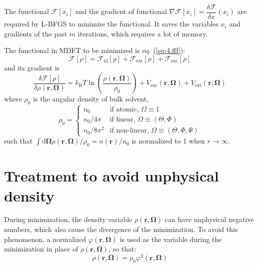 The functional $\mathcal{F}[x_{i}]$ and the gradient of functional
$\nabla\mathcal{F}[x_{i}]=\dfrac{\delta\mathcal{F}}{\delta x}(x_{i})$
are required by L-BFGS to minimize the functional. It saves the variables
$x_{i}$ and gradients of the past $m$ iterations, which requires
a lot of memory.

The functional in MDFT to be minimized is eq. (\ref{eq:4.fff}):
\begin{equation}
\mathcal{F}[\rho]=\mathcal{F}_{\mathrm{id}}[\rho]+\mathcal{F}_{\mathrm{ext}}[\rho]+\mathcal{F}_{\mathrm{exc}}[\rho]
\end{equation}
and its gradient is
\begin{equation}
\frac{\delta\mathcal{F}[\rho]}{\delta\rho(\mathbf{r},\mathbf{\Omega})}=k_{\mathrm{B}}T\ln\left(\dfrac{\rho(\mathbf{r},\mathbf{\Omega})}{\rho_{0}}\right)+V_{\mathrm{exc}}(\mathbf{r},\mathbf{\Omega})+V_{\mathrm{ext}}(\mathbf{r},\mathbf{\Omega})
\end{equation}
where $\rho_{0}$ is the angular density of bulk solvent, 
\begin{equation}
\rho_{0}=\left\{ \begin{array}{ll}
n_{0} & \mbox{if atomic, }\Omega\equiv1\\
n_{0}/4\pi & \mbox{if linear, }\Omega\equiv(\Theta,\Phi)\\
n_{0}/8\pi^{2} & \mbox{if non-linear, }\Omega\equiv(\Theta,\Phi,\Psi)
\end{array}\right.\label{eq:rho}
\end{equation}
such that $\int\mathrm{d}\mathbf{\Omega}\rho(\mathbf{r},\mathbf{\Omega})/\rho_{0}=n(\mathbf{r})/n_{0}$
is normalized to 1 when $r\rightarrow\infty$.

\section{Treatment to avoid unphysical density}

During minimization, the density variable $\rho(\mathbf{r},\mathbf{\Omega})$
can have unphysical negative numbers, which also cause the divergence
of the minimization. To avoid this phenomenon, a normalized $\varphi(\mathbf{r},\mathbf{\Omega})$
is used as the variable during the minimization in place of $\rho(\mathbf{r},\mathbf{\Omega})$,
so that:
\begin{equation}
\rho(\mathbf{r},\mathbf{\Omega})=\rho_{0}\varphi^{2}(\mathbf{r},\mathbf{\Omega})\label{eq:cg_vect}
\end{equation}

